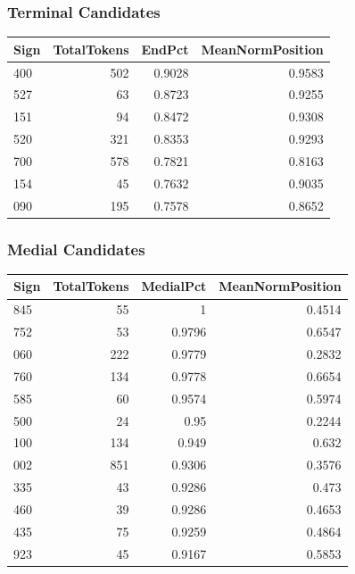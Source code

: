 ﻿\documentclass[11pt,a4paper]{article}
\begin{document}
\subsubsection*{Terminal Candidates}
\begin{center}
\begin{tabular}{lrrr}
\toprule
\textbf{Sign} & \textbf{TotalTokens} & \textbf{EndPct} & \textbf{MeanNormPosition} \\
\midrule
400 & 502 & 0.9028 & 0.9583 \\
527 & 63 & 0.8723 & 0.9255 \\
151 & 94 & 0.8472 & 0.9308 \\
520 & 321 & 0.8353 & 0.9293 \\
700 & 578 & 0.7821 & 0.8163 \\
154 & 45 & 0.7632 & 0.9035 \\
090 & 195 & 0.7578 & 0.8652 \\
\bottomrule
\end{tabular}
\end{center}

\subsubsection*{Medial Candidates}
\begin{center}
\begin{tabular}{lrrr}
\toprule
\textbf{Sign} & \textbf{TotalTokens} & \textbf{MedialPct} & \textbf{MeanNormPosition} \\
\midrule
845 & 55 & 1 & 0.4514 \\
752 & 53 & 0.9796 & 0.6547 \\
060 & 222 & 0.9779 & 0.2832 \\
760 & 134 & 0.9778 & 0.6654 \\
585 & 60 & 0.9574 & 0.5974 \\
500 & 24 & 0.95 & 0.2244 \\
100 & 134 & 0.949 & 0.632 \\
002 & 851 & 0.9306 & 0.3576 \\
335 & 43 & 0.9286 & 0.473 \\
460 & 39 & 0.9286 & 0.4653 \\
435 & 75 & 0.9259 & 0.4864 \\
923 & 45 & 0.9167 & 0.5853 \\
\bottomrule
\end{tabular}
\end{center}
\end{document}
